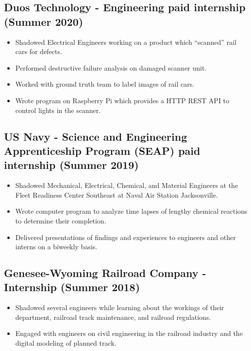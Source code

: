 \documentclass{article}
\newenvironment{CustomItemize}
{ \begin{itemize}[leftmargin=1em]
    \setlength{\itemsep}{0pt}
    \setlength{\parskip}{0pt}
    \setlength{\parindent}{0pt}
    \setlength{\parsep}{0pt}     }
{ \end{itemize}                  }
\begin{document}
\subsection{Duos Technology - Engineering paid internship (Summer 2020)}
\begin{CustomItemize}
\item Shadowed Electrical Engineers working on a product which ``scanned'' rail cars for defects.
\item Performed destructive failure analysis on damaged scanner unit.
\item Worked with ground truth team to label images of rail cars.
\item Wrote program on Raspberry Pi which provides a HTTP REST API to control lights in the scanner.
\end{CustomItemize}

\subsection{US Navy - Science and Engineering Apprenticeship Program (SEAP) paid internship (Summer 2019)}
\begin{CustomItemize}
\item Shadowed Mechanical, Electrical, Chemical, and Material Engineers at the Fleet Readiness Center Southeast at Naval Air Station Jacksonville.
\item Wrote computer program to analyze time lapses of lengthy chemical reactions to determine their completion.
\item Delivered presentations of findings and experiences to engineers and other interns on a biweekly basis.
\end{CustomItemize}

\subsection{Genesee-Wyoming Railroad Company - Internship (Summer 2018)}
\begin{CustomItemize}
\item Shadowed several engineers while learning about the workings of their department, railroad track maintenance, and railroad regulations.
\item Engaged with engineers on civil engineering in the railroad industry and the digital modeling of planned track.
\end{CustomItemize}

\end{document}
